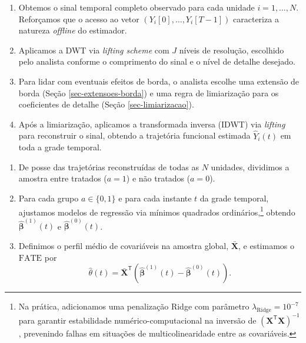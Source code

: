\begin{estimatorboxB}
    \begin{enumerate}
        \item Obtemos o sinal temporal completo observado para cada unidade \(i = 1, \dots, N\). 
        Reforçamos que o acesso ao vetor \((Y_i[0], \dots, Y_i[T-1])\) caracteriza a natureza \emph{offline} do estimador.
        \item Aplicamos a DWT via \emph{lifting scheme} com \(J\) níveis de resolução, escolhido pelo analista conforme o comprimento do sinal e o nível de detalhe desejado.
        \item Para lidar com eventuais efeitos de borda, o analista escolhe uma extensão de borda (Seção \ref{sec-extensoes-borda}) e uma regra de limiarização para os coeficientes de detalhe (Seção \ref{sec-limiarizacao}).
        \item Após a limiarização, aplicamos a transformada inversa (IDWT) via \emph{lifting} para reconstruir o sinal, obtendo a trajetória funcional estimada \(\hat{Y}_i(t)\) em toda a grade temporal.
    \end{enumerate}
\end{estimatorboxB}

\begin{estimatorboxB}
    \begin{enumerate}
        \item De posse das trajetórias reconstruídas de todas as \(N\) unidades, dividimos a amostra entre tratados (\(a = 1\)) e não tratados (\(a = 0\)).

        \item Para cada grupo \(a \in \{0,1\}\) e para cada instante \(t\) da grade temporal, ajustamos modelos de regressão via mínimos quadrados ordinários,\footnote{Na prática, adicionamos uma penalização Ridge com parâmetro \(\lambda_{\text{Ridge}} = 10^{-7}\) para garantir estabilidade numérico-computacional na inversão de \((\mathbf{X}^{\mathsf{T}}\mathbf{X})^{-1}\), prevenindo falhas em situações de multicolinearidade entre as covariáveis.} obtendo \(\hat{\boldsymbol{\beta}}^{(1)}(t)\) e \(\hat{\boldsymbol{\beta}}^{(0)}(t)\).

        \item Definimos o perfil médio de covariáveis na amostra global, \(\bar{\mathbf{X}}\), e estimamos o \(\mathrm{FATE}\) por
        \[
            \hat{\theta}(t) = \bar{\mathbf{X}}^{\mathsf{T}}\left(\hat{\boldsymbol{\beta}}^{(1)}(t) - \hat{\boldsymbol{\beta}}^{(0)}(t)\right).
        \]
    \end{enumerate}
\end{estimatorboxB}


